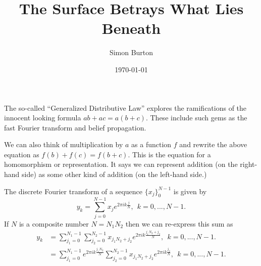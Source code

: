 \documentclass[12pt]{article}
\begin{document}
\title{The Surface Betrays What Lies Beneath}

\author{Simon Burton}

\date{\today}


\maketitle


\def\Complex{\mathbb{C}}
\def\Z{\mathbb{Z}}
\def\Ham{\mathcal{H}}
\def\Pauli{\mathcal{P}}
\def\Spec{\mbox{Spec}}
\def\Proveit{{\it (Proof??)}}
\def\GL{\mathrm{GL}}
\def\half{\frac{1}{2}}
\def\Stab{S}


%
%


The so-called ``Generalized Distributive Law''
\cite{Aji2000}
explores the ramifications of the innocent looking
formula $ab+ac = a(b+c).$
These include such gems as the fast Fourier transform
and belief propagation.

We can also think of multiplication by $a$ as a function $f$
and rewrite the above equation as $f(b)+f(c)=f(b+c).$
This is the equation for a homomorphism or representation.
It says we can represent addition (on the right-hand side)
as some other kind of addition (on the left-hand side.)

The discrete Fourier transform of a sequence $\{x_j\}_0^{N-1}$
is given by
$$
    y_k = \sum_{j=0}^{N-1} x_j e^{2\pi i k \frac{j}{N}}, \ \ k=0,...,N-1.
$$
If $N$ is a composite number $N=N_1 N_2$ then we can re-express this sum as
\begin{align*}
    y_k &= \sum_{j_1=0}^{N_1-1} \sum_{j_2=0}^{N_2-1} x_{j_1 N_2 + j_2}
            e^{2\pi i k \frac{j_1 N_2 + j_2}{N}}, \ \ k=0,...,N-1. \\
        &= \sum_{j_1=0}^{N_1-1}
            e^{2\pi i k \frac{j_1 N_2}{N}}
            \sum_{j_2=0}^{N_2-1} x_{j_1 N_2 + j_2}
            e^{2\pi i k \frac{j_2}{N}}, \ \ k=0,...,N-1.
\end{align*}
\end{document}
